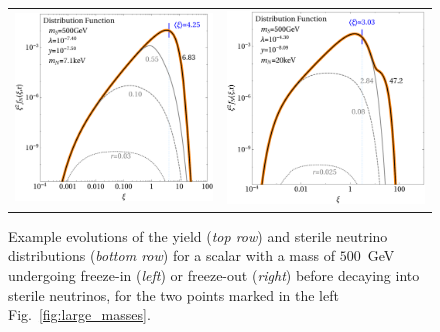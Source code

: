 \begin{figure}[t!]
\begin{tabular}{cc}
 \hspace{-1cm}\includegraphics[width=8.3cm]{figures/snapshots500FIMP.pdf} & \includegraphics[width=8.3cm]{figures/snapshots500WIMP.pdf}
\end{tabular}
\caption{\label{fig:FIMP_WIMP_500}Example evolutions of the yield (\emph{top row}) and sterile neutrino distributions (\emph{bottom row}) for a scalar with a mass of $500$~GeV undergoing freeze-in (\emph{left}) or freeze-out (\emph{right}) before decaying into sterile neutrinos, for the two points marked in the left Fig.~\ref{fig:large_masses}.}
\end{figure}


